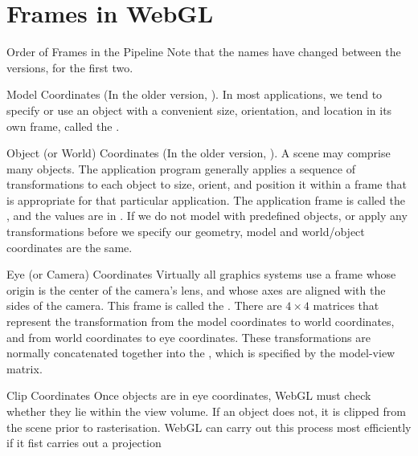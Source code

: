 \documentclass[../COS3712_Notes.tex]{subfiles}
\begin{document}
    \section{Frames in WebGL}
      \begin{sidenote}{Order of Frames in the Pipeline}
        Note that the names have changed between the versions, for the first two.

        \begin{descriptenum}
          \item[Model Coordinates] (In the older version, ).
            In most applications, we tend to specify or use
            an object with a convenient size, orientation, and location in its own frame,
            called the .
          \item[Object (or World) Coordinates] (In the older version,
            ).
            A scene may comprise many objects.
            The application program generally applies a sequence of transformations to each object
            to size, orient, and position it within a frame that is appropriate for that particular
            application.
            The application frame is called the ,
            and the values are in .
            If we do not model with predefined objects, or apply any transformations before
            we specify our geometry, model and world/object coordinates are the same.
          \item[Eye (or Camera) Coordinates] Virtually all graphics systems use a frame
            whose origin is the center of the camera's lens, and whose axes are aligned
            with the sides of the camera.
            This frame is called the .
            There are $4 \times 4$ matrices that represent the transformation from the
            model coordinates to world coordinates, and from world coordinates to eye coordinates.
            These transformations are normally concatenated together into the
            , which is specified by the model-view matrix.
          \item[Clip Coordinates] Once objects are in eye coordinates, WebGL must check whether
            they lie within the view volume.
            If an object does not, it is clipped from the scene prior to rasterisation.
            WebGL can carry out this process most efficiently if it fist carries out a projection

\end{descriptenum}
\end{sidenote}
\end{document}

